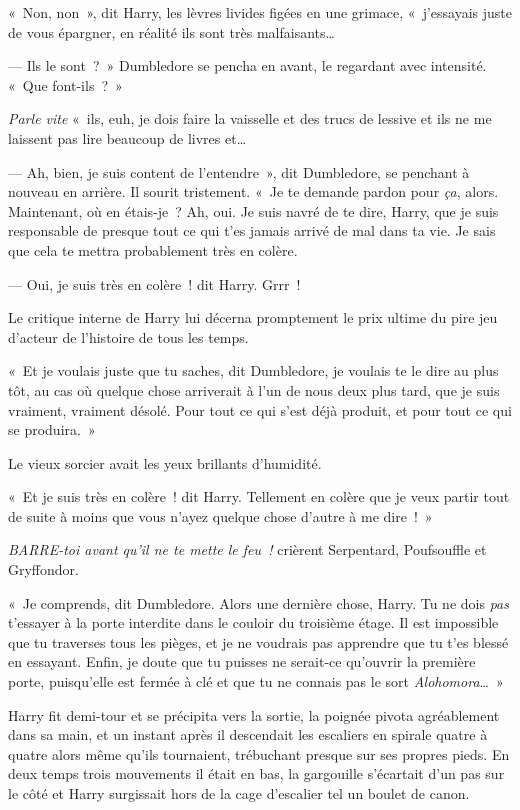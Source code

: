 «~Non, non~», dit Harry, les lèvres livides figées en une grimace, «~j'essayais juste de vous épargner, en réalité ils sont très malfaisants…

--- Ils le sont~?~»
Dumbledore se pencha en avant, le regardant avec intensité.
«~Que font-ils~?~»

\emph{Parle vite} «~ils, euh, je dois faire la vaisselle et des trucs de lessive et ils ne me laissent pas lire beaucoup de livres et…

--- Ah, bien, je suis content de l'entendre~», dit Dumbledore, se penchant à nouveau en arrière.
Il sourit tristement.
«~Je te demande pardon pour \emph{ça}, alors.
Maintenant, où en étais-je~?
Ah, oui.
Je suis navré de te dire, Harry, que je suis responsable de presque tout ce qui t'es jamais arrivé de mal dans ta vie.
Je sais que cela te mettra probablement très en colère.

--- Oui, je suis très en colère~! dit Harry.
Grrr~!

Le critique interne de Harry lui décerna promptement le prix ultime du pire jeu d'acteur de l'histoire de tous les temps.

«~Et je voulais juste que tu saches, dit Dumbledore, je voulais te le dire au plus tôt, au cas où quelque chose arriverait à l'un de nous deux plus tard, que je suis vraiment, vraiment désolé.
Pour tout ce qui s'est déjà produit, et pour tout ce qui se produira.~»

Le vieux sorcier avait les yeux brillants d'humidité.

«~Et je suis très en colère~! dit Harry.
Tellement en colère que je veux partir tout de suite à moins que vous n'ayez quelque chose d'autre à me dire~!~»

\emph{BARRE-toi avant qu'il ne te mette le feu~!} crièrent Serpentard, Poufsouffle et Gryffondor.

«~Je comprends, dit Dumbledore.
Alors une dernière chose, Harry.
Tu ne dois \emph{pas} t'essayer à la porte interdite dans le couloir du troisième étage.
Il est impossible que tu traverses tous les pièges, et je ne voudrais pas apprendre que tu t'es blessé en essayant.
Enfin, je doute que tu puisses ne serait-ce qu'ouvrir la première porte, puisqu'elle est fermée à clé et que tu ne connais pas le sort \emph{Alohomora}…~»

Harry fit demi-tour et se précipita vers la sortie, la poignée pivota agréablement dans sa main, et un instant après il descendait les escaliers en spirale quatre à quatre alors même qu'ils tournaient, trébuchant presque sur ses propres pieds.
En deux temps trois mouvements il était en bas, la gargouille s'écartait d'un pas sur le côté et Harry surgissait hors de la cage d'escalier tel un boulet de canon.


